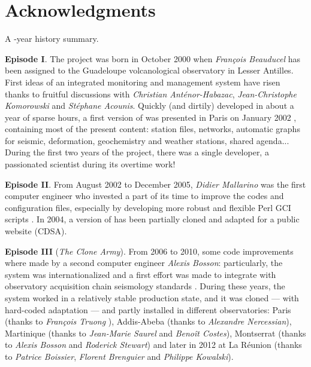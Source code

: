 
\chapter{Acknowledgments}


A \hspace{-12pt}-year history summary.

\textbf{Episode I}. The \webobs project was born in October 2000 when \textit{François Beauducel} has been assigned to the Guadeloupe volcanological observatory in Lesser Antilles. First ideas of an integrated monitoring and management system have risen thanks to fruitful discussions with \textit{Christian Anténor-Habazac}, \textit{Jean-Christophe Komorowski} and \textit{Stéphane Acounis}. Quickly (and dirtily) developed in about a year of sparse hours, a first version of \webobs was presented in Paris on January 2002 \citep{beauducel2002qes}, containing most of the present content: station files, networks, automatic graphs for seismic, deformation, geochemistry and weather stations, shared agenda... During the first two years of the project, there was a single developer, a passionated scientist during its overtime work!

\textbf{Episode II}. From August 2002 to December 2005, \textit{Didier Mallarino} was the first computer engineer who invested a part of its time to improve the codes and configuration files, especially by developing more robust and flexible Perl GCI scripts \citep{beauducel2004webovs,beauducel2005wim,beauducel2006sov}. In 2004, a version of \webobs has been partially cloned and adapted for a public website (CDSA).

\textbf{Episode III} (\textit{The Clone Army}). From 2006 to 2010, some code improvements where made by a second computer engineer \textit{Alexis Bosson}: particularly, the system was internationalized and a first effort was made to integrate \webobs with observatory acquisition chain seismology standards \citep{beauducel2010webobs}. During these years, the system worked in a relatively stable production state, and it was cloned --- with hard-coded adaptation --- and partly installed in different observatories: Paris (thanks to \textit{François Truong} \citep{truong2009magis}), Addis-Abeba (thanks to \textit{Alexandre Nercessian}), Martinique (thanks to \textit{Jean-Marie Saurel} and \textit{Benoît Costes}), Montserrat (thanks to \textit{Alexis Bosson} and \textit{Roderick Stewart}) and later in 2012 at La Réunion (thanks to \textit{Patrice Boissier}, \textit{Florent Brenguier} and \textit{Philippe Kowalski}).

